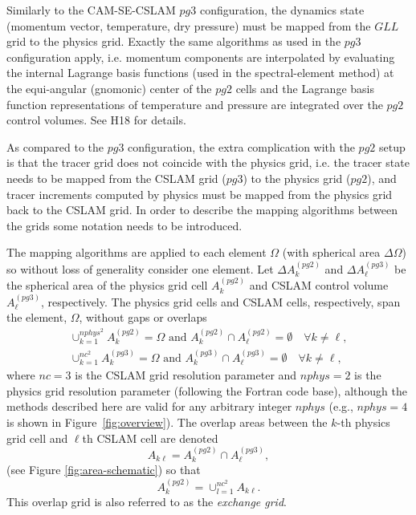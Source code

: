 \documentclass{agujournal}
\begin{document}
Similarly to the CAM-SE-CSLAM $pg3$ configuration, the dynamics state (momentum vector, temperature, dry pressure) must be mapped from the $GLL$ grid to the physics grid. Exactly the same algorithms as used in the $pg3$ configuration apply, i.e. momentum components are interpolated by evaluating the internal Lagrange basis functions (used in the spectral-element method) at the equi-angular (gnomonic) center of the $pg2$ cells and the Lagrange basis function representations of temperature and pressure are integrated over the $pg2$ control volumes. See H18 for details.

As compared to the $pg3$ configuration, the extra complication with the $pg2$ setup is that the tracer grid does not coincide with the physics grid, i.e. the tracer state needs to be mapped from the CSLAM grid ($pg3$) to the physics grid ($pg2$), and tracer increments computed by physics must be mapped from the physics grid back to the CSLAM grid. In order to describe the mapping algorithms between the grids some notation needs to be introduced.

The mapping algorithms are applied to each element $\Omega$ (with spherical area $\Delta \Omega$) so without loss of generality consider one element. Let $\Delta A^{(pg2)}_k$ and $\Delta A^{(pg3)}_\ell$ be the spherical area of the physics grid cell $A^{(pg2)}_k$ and CSLAM control volume $A^{(pg3)}_\ell$, respectively. The physics grid cells and CSLAM cells, respectively, span the element, $\Omega$, without gaps or overlaps
\begin{eqnarray}
\cup_{k=1}^{nphys^2}A^{(pg2)}_k=\Omega \text{ and } A^{(pg2)}_k \cap A^{(pg2)}_\ell = \emptyset \quad \forall k\ne \ell,\\
\cup_{k=1}^{nc^2}A^{(pg3)}_k=\Omega \text{ and } A^{(pg3)}_k \cap A^{(pg3)}_\ell = \emptyset \quad \forall k\ne \ell,
\end{eqnarray}
where $nc=3$ is the CSLAM grid resolution parameter and $nphys=2$ is the physics grid resolution parameter (following the Fortran code base), although the methods described here are valid for any arbitrary integer $nphys$ (e.g., $nphys=4$ is shown in Figure~\ref{fig:overview}). The overlap areas between the $k$-th physics grid cell and $\ell$th CSLAM cell are denoted
\begin{equation}
A_{k\ell}=A^{(pg2)}_k \cap A^{(pg3)}_\ell,
\end{equation}
(see Figure \ref{fig:area-schematic}) so that
\begin{equation}
A^{(pg2)}_k=\cup_{l=1}^{nc^2}A_{k\ell}.
\end{equation}
This overlap grid is also referred to as the {\em{exchange grid}}.
\end{document}
